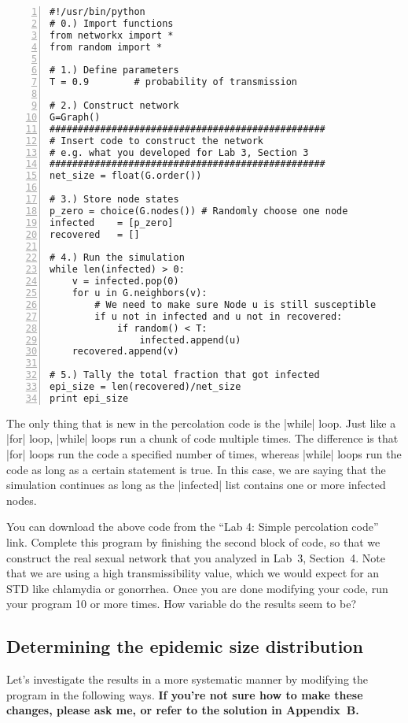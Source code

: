 \documentclass{article}
\begin{document}
\begin{Verbatim}[numbers=left, samepage=true]
#!/usr/bin/python
# 0.) Import functions
from networkx import *
from random import *

# 1.) Define parameters
T = 0.9        # probability of transmission

# 2.) Construct network
G=Graph()
#################################################
# Insert code to construct the network
# e.g. what you developed for Lab 3, Section 3
#################################################
net_size = float(G.order())

# 3.) Store node states
p_zero = choice(G.nodes()) # Randomly choose one node
infected    = [p_zero]
recovered   = []

# 4.) Run the simulation
while len(infected) > 0:
    v = infected.pop(0)
    for u in G.neighbors(v):
        # We need to make sure Node u is still susceptible
        if u not in infected and u not in recovered:
            if random() < T:
                infected.append(u)
    recovered.append(v)

# 5.) Tally the total fraction that got infected
epi_size = len(recovered)/net_size
print epi_size
\end{Verbatim}

The only thing that is new in the percolation code is the |while| loop.  Just like a |for| loop, |while| loops run a chunk of code multiple times.  The
difference is that |for| loops run the code a specified number of times, whereas |while| loops run the code as long as a certain statement is true.  In
this case, we are saying that the simulation continues as long as the |infected| list contains one or more infected nodes.

You can download the above code from the ``Lab 4: Simple percolation code'' link.  Complete this program by finishing the second block of code, so that
we construct the real sexual network that you analyzed in Lab~3, Section~4.  Note that we are using a high transmissibility value, which we would expect
for an STD like chlamydia or gonorrhea.  Once you are done modifying your code, run your program 10 or more times.  How 
variable do the results seem to be?

\subsection{Determining the epidemic size distribution}
\label{epi_size}
Let's investigate the results in a more systematic manner by modifying the program in the following ways.  \textbf{If you're
not sure how to make these changes, please ask me, or refer to the solution in Appendix~B.}
\end{document}
